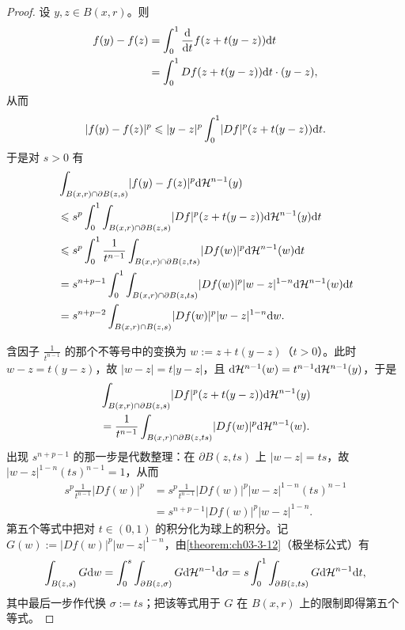 \documentclass[../../main.tex]{subfiles}%
\begin{document}
\begin{proof}
设 $y,z\in B(x,r)$。则
\begin{align*}
f(y)-f(z)&=\int_0^1\frac{\mathrm{d}}{\mathrm{d} t}f(z+t(y-z))\mathrm{d} t\\
&=\int_0^1Df(z+t(y-z))\mathrm{d} t\cdot(y-z),
\end{align*}
从而
\begin{align*}
\lvert f(y)-f(z)\rvert^{p}\leqslant\lvert y-z\rvert^{p}\int_0^1\lvert Df\rvert^{p}(z+t(y-z))\mathrm{d} t .
\end{align*}
于是对 $s>0$ 有
\begin{align*}
&\int_{B(x,r)\cap\partial B(z,s)}\lvert f(y)-f(z)\rvert^{p}\mathrm{d}\mathcal{H}^{n-1}(y)\\
&\leqslant s^{p}\int_0^1\int_{B(x,r)\cap\partial B(z,s)}\lvert Df\rvert^{p}(z+t(y-z))\mathrm{d}\mathcal{H}^{n-1}(y)\mathrm{d} t\\
&\leqslant s^{p}\int_0^1\frac{1}{t^{n-1}}\int_{B(x,r)\cap\partial B(z,ts)}\lvert Df(w)\rvert^{p}\mathrm{d}\mathcal{H}^{n-1}(w)\mathrm{d} t\\
&=s^{n+p-1}\int_0^1\int_{B(x,r)\cap\partial B(z,ts)}\lvert Df(w)\rvert^{p}\lvert w-z\rvert^{1-n}\mathrm{d}\mathcal{H}^{n-1}(w)\mathrm{d} t\\
&=s^{n+p-2}\int_{B(x,r)\cap B(z,s)}\lvert Df(w)\rvert^{p}\lvert w-z\rvert^{1-n}\mathrm{d} w .
\end{align*}

含因子 $\frac{1}{t^{n-1}}$ 的那个不等号中的变换为 $w:=z+t(y-z)$（$t>0$）。此时 $w-z=t(y-z)$，故 $\lvert w-z\rvert=t\lvert y-z\rvert$，且 $\mathrm{d}\mathcal{H}^{n-1}(w)=t^{n-1}\mathrm{d}\mathcal{H}^{n-1}(y)$，于是
\begin{align*}
&\int_{B(x,r)\cap\partial B(z,s)}\lvert Df\rvert^{p}(z+t(y-z))\mathrm{d}\mathcal{H}^{n-1}(y)\\
&=\frac{1}{t^{n-1}}\int_{B(x,r)\cap\partial B(z,ts)}\lvert Df(w)\rvert^{p}\mathrm{d}\mathcal{H}^{n-1}(w).
\end{align*}
出现 $s^{n+p-1}$ 的那一步是代数整理：在 $\partial B(z,ts)$ 上 $\lvert w-z\rvert=ts$，故 $\lvert w-z\rvert^{1-n}(ts)^{n-1}=1$，从而
\begin{align*}
s^{p}\frac{1}{t^{n-1}}\lvert Df(w)\rvert^{p}
&=s^{p}\frac{1}{t^{n-1}}\lvert Df(w)\rvert^{p}\lvert w-z\rvert^{1-n}(ts)^{n-1}\\
&=s^{n+p-1}\lvert Df(w)\rvert^{p}\lvert w-z\rvert^{1-n}.
\end{align*}
第五个等式中把对 $t\in(0,1)$ 的积分化为球上的积分。记 $G(w):=\lvert Df(w)\rvert^{p}\lvert w-z\rvert^{1-n}$，由\cref{theorem:ch03-3-12}（极坐标公式）有%
\begin{align*}
\int_{B(z,s)}G\mathrm{d} w=\int_0^{s}\int_{\partial B(z,\sigma)}G\mathrm{d}\mathcal{H}^{n-1}\mathrm{d}\sigma=s\int_0^1\int_{\partial B(z,ts)}G\mathrm{d}\mathcal{H}^{n-1}\mathrm{d} t,
\end{align*}
其中最后一步作代换 $\sigma:=ts$；把该等式用于 $G$ 在 $B(x,r)$ 上的限制即得第五个等式。


\end{proof}
\end{document}
